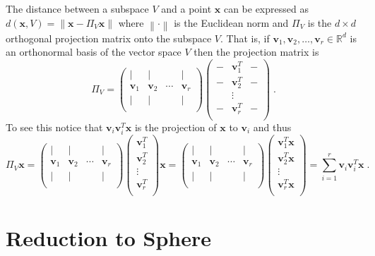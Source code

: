 \documentclass[12pt]{article}
\newcommand{\R}{\mathbb{R}}
\newcommand{\norm}[1]{\left\|#1\right\|}
\renewcommand{\v}{\mathbf{v}}
\newcommand{\x}{\mathbf{x}}
\begin{document}
The distance between a subspace $V$ and a point $\x$ can be expressed as
$d(\x,V) = \norm{\x - \Pi_V \x}$ where $\norm{\cdot}$ is the Euclidean norm and
$\Pi_V$ is the $d \times d$ orthogonal projection matrix onto the subspace $V$.
That is, if $\v_1, \v_2, \dots, \v_r \in \R^d$ is an orthonormal basis of the
vector space $V$ then the projection matrix is
$$
\Pi_V =
\begin{pmatrix}
\vert & \vert &  & \vert \\
\v_1 & \v_2 & \cdots & \v_r \\
\vert & \vert &  & \vert \\
\end{pmatrix}
\begin{pmatrix}
- & \v_1^T & - \\
- & \v_2^T & - \\
  & \vdots &  \\
- & \v_r^T & - \\
\end{pmatrix} \; .
$$
To see this notice that $\v_i \v_i^T \x$ is the projection of $\x$ to $\v_i$
and thus
$$
\Pi_V \x
=
\begin{pmatrix}
\vert & \vert &  & \vert \\
\v_1 & \v_2 & \cdots & \v_r \\
\vert & \vert &  & \vert \\
\end{pmatrix}
\begin{pmatrix}
\v_1^T \\
\v_2^T \\
\vdots  \\
\v_r^T \\
\end{pmatrix}
\x
=
\begin{pmatrix}
\vert & \vert &  & \vert \\
\v_1 & \v_2 & \cdots & \v_r \\
\vert & \vert &  & \vert \\
\end{pmatrix}
\begin{pmatrix}
\v_1^T \x\\
\v_2^T \x\\
\vdots  \\
\v_r^T \x\\
\end{pmatrix}
= \sum_{i=1}^r \v_i \v_i^T \x \; .
$$

\section{Reduction to Sphere}
\label{section:sphere-reduction}
\end{document}
